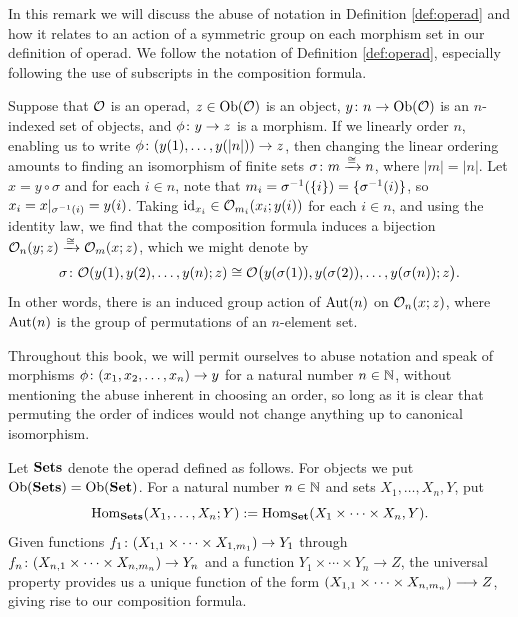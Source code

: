 \documentclass[CT4S-EN-RU]{subfiles}
\begin{document}
\begin{remark}\label{rem:symmetry}

In this remark we will discuss the abuse of notation in Definition \ref{def:operad} and how it relates to an action of a symmetric group on each morphism set in our definition of operad. We follow the notation of Definition \ref{def:operad}, especially following the use of subscripts in the composition formula.

Suppose that $\mathcal{O}$ is an operad, $z\in\textnormal{Ob}(\mathcal{O})$ is an object, $y\colon n\rightarrow\textnormal{Ob}(\mathcal{O})$ is an $n$-indexed set of objects, and $\phi\colon y\rightarrow z$ is a morphism. If we linearly order $n$, enabling us to write $\phi\colon (y(1),\ldots,y(|n|))\rightarrow z$, then changing the linear ordering amounts to finding an isomorphism of finite sets $\sigma\colon m\xrightarrow{\cong} n$, where $|m|=|n|$. Let $x=y\circ\sigma$ and for each $i\in n$, note that $m_i=\sigma^\m1(\{i\})=\{\sigma^\m1(i)\}$, so $x_i=x|_{\sigma^\m1(i)}=y(i)$. Taking $\textnormal{id}_{x_i}\in\mathcal{O}_{m_i}(x_i;y(i))$ for each $i\in n$, and using the identity law, we find that the composition formula induces a bijection $\mathcal{O}_n(y;z)\xrightarrow{\cong}\mathcal{O}_m(x;z)$, which we might denote by 
$$\sigma\colon\mathcal{O}(y(1),y(2),\ldots,y(n);z)\cong\mathcal{O}\big(y(\sigma(1)),y(\sigma(2)),\ldots,y(\sigma(n));z\big).$$
In other words, there is an induced group action of $\textnormal{Aut}(n)$ on $\mathcal{O}_n(x;z)$, where $\textnormal{Aut}(n)$ is the group of permutations of an $n$-element set.

Throughout this book, we will permit ourselves to abuse notation and speak of morphisms $\phi\colon (x_1,x_2,\ldots,x_n)\rightarrow y$ for a natural number $n\in{\mathbb N}$, without mentioning the abuse inherent in choosing an order, so long as it is clear that permuting the order of indices would not change anything up to canonical isomorphism.

\end{remark}

\begin{example}

Let ${\bf Sets}$ denote the operad defined as follows. For objects we put $\textnormal{Ob}({\bf Sets})=\textnormal{Ob}({\bf Set})$. For a natural number $n\in{\mathbb N}$ and sets $X_1,\ldots,X_n,Y$, put 
$$\textnormal{Hom}_{\bf Sets}(X_1,\ldots,X_n;Y):=\textnormal{Hom}_{\bf Set}(X_1\times\cdots\times X_n,Y).$$
Given functions $f_1\colon(X_{1,1}\times\cdots\times X_{1,m_1})\rightarrow Y_1$ through $f_n\colon (X_{n,1}\times\cdots\times X_{n,m_n})\rightarrow Y_n$ and a function $Y_1\times\cdots\times Y_n\to Z$, the universal property provides us a unique function of the form $(X_{1,1}\times\cdots\times X_{n,m_n})\longrightarrow Z$, giving rise to our composition formula.

\end{example}
\end{document}
